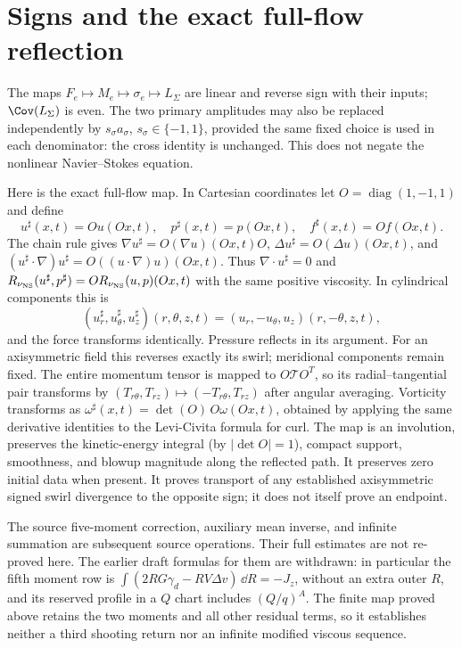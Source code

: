 \section{Signs and the exact full-flow reflection}
The maps $F_e\mapsto M_e\mapsto\sigma_e\mapsto L_\Sigma$ are linear
and reverse sign with their inputs; $\Cov(L_\Sigma)$ is even.
The two primary amplitudes may also be replaced independently by
$s_\sigma a_\sigma$, $s_\sigma\in\{-1,1\}$, provided the same fixed
choice is used in each denominator: the cross identity is unchanged.
This does not negate the nonlinear Navier--Stokes equation.

Here is the exact full-flow map. In Cartesian coordinates let
$O=\operatorname{diag}(1,-1,1)$ and define
\[
 u^\sharp(x,t)=O u(Ox,t),\quad
 p^\sharp(x,t)=p(Ox,t),\quad f^\sharp(x,t)=O f(Ox,t).
\]
The chain rule gives
$\nabla u^\sharp=O(\nabla u)(Ox,t)O$,
$\Delta u^\sharp=O(\Delta u)(Ox,t)$, and
$(u^\sharp\cdot\nabla)u^\sharp
 =O((u\cdot\nabla)u)(Ox,t)$.
Thus $\nabla\cdot u^\sharp=0$ and
$R_{\nu_{\rm NS}}(u^\sharp,p^\sharp)=O R_{\nu_{\rm NS}}(u,p)(Ox,t)$
with the same positive viscosity.
In cylindrical components this is
\[
 (u_r^\sharp,u_\theta^\sharp,u_z^\sharp)(r,\theta,z,t)
 =(u_r,-u_\theta,u_z)(r,-\theta,z,t),
\]
and the force transforms identically. Pressure reflects in its argument.
For an axisymmetric field this reverses exactly its swirl; meridional
components remain fixed. The entire momentum tensor is mapped to
$O\mathcal T O^T$, so its radial--tangential pair transforms by
$(T_{r\theta},T_{rz})\mapsto(-T_{r\theta},T_{rz})$ after angular
averaging. Vorticity transforms as
$\omega^\sharp(x,t)=\det(O)\,O\omega(Ox,t)$, obtained by applying
the same derivative identities to the Levi-Civita formula for curl.
The map is an involution, preserves the kinetic-energy integral
(by $|\det O|=1$), compact support, smoothness, and blowup magnitude
along the reflected path. It preserves zero initial data when present.
It proves transport of any established axisymmetric signed swirl
divergence to the opposite sign; it does not itself prove an endpoint.

The source five-moment correction, auxiliary mean inverse, and infinite
summation are subsequent source operations. Their full estimates are
not re-proved here. The earlier draft formulas for them are withdrawn:
in particular the fifth moment row is
$\int(2RG\gamma_d-RV\Delta v)\,\dd R=-J_z$, without an extra outer
$R$, and its reserved profile in a $Q$ chart includes $(Q/q)^A$.
The finite map proved above retains the two moments and all other
residual terms, so it establishes neither a third shooting return nor
an infinite modified viscous sequence.
